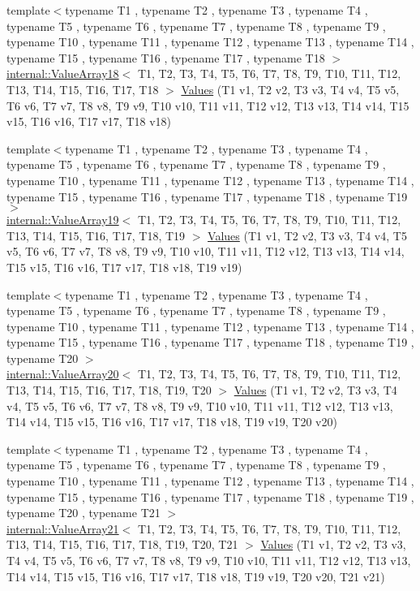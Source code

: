 \begin{DoxyCompactItemize}
\item 
{\footnotesize template$<$typename T1 , typename T2 , typename T3 , typename T4 , typename T5 , typename T6 , typename T7 , typename T8 , typename T9 , typename T10 , typename T11 , typename T12 , typename T13 , typename T14 , typename T15 , typename T16 , typename T17 , typename T18 $>$ }\\\mbox{\hyperlink{classtesting_1_1internal_1_1ValueArray18}{internal\+::\+Value\+Array18}}$<$ T1, T2, T3, T4, T5, T6, T7, T8, T9, T10, T11, T12, T13, T14, T15, T16, T17, T18 $>$ \mbox{\hyperlink{namespacetesting_ab442a00c98b4bfb3bfa81f5e06bf53f9}{Values}} (T1 v1, T2 v2, T3 v3, T4 v4, T5 v5, T6 v6, T7 v7, T8 v8, T9 v9, T10 v10, T11 v11, T12 v12, T13 v13, T14 v14, T15 v15, T16 v16, T17 v17, T18 v18)
\item 
{\footnotesize template$<$typename T1 , typename T2 , typename T3 , typename T4 , typename T5 , typename T6 , typename T7 , typename T8 , typename T9 , typename T10 , typename T11 , typename T12 , typename T13 , typename T14 , typename T15 , typename T16 , typename T17 , typename T18 , typename T19 $>$ }\\\mbox{\hyperlink{classtesting_1_1internal_1_1ValueArray19}{internal\+::\+Value\+Array19}}$<$ T1, T2, T3, T4, T5, T6, T7, T8, T9, T10, T11, T12, T13, T14, T15, T16, T17, T18, T19 $>$ \mbox{\hyperlink{namespacetesting_a673757dbfc048bbb48e459485b30b2bf}{Values}} (T1 v1, T2 v2, T3 v3, T4 v4, T5 v5, T6 v6, T7 v7, T8 v8, T9 v9, T10 v10, T11 v11, T12 v12, T13 v13, T14 v14, T15 v15, T16 v16, T17 v17, T18 v18, T19 v19)
\item 
{\footnotesize template$<$typename T1 , typename T2 , typename T3 , typename T4 , typename T5 , typename T6 , typename T7 , typename T8 , typename T9 , typename T10 , typename T11 , typename T12 , typename T13 , typename T14 , typename T15 , typename T16 , typename T17 , typename T18 , typename T19 , typename T20 $>$ }\\\mbox{\hyperlink{classtesting_1_1internal_1_1ValueArray20}{internal\+::\+Value\+Array20}}$<$ T1, T2, T3, T4, T5, T6, T7, T8, T9, T10, T11, T12, T13, T14, T15, T16, T17, T18, T19, T20 $>$ \mbox{\hyperlink{namespacetesting_aedd2f90dfb3c42dce713ba0b89cde96c}{Values}} (T1 v1, T2 v2, T3 v3, T4 v4, T5 v5, T6 v6, T7 v7, T8 v8, T9 v9, T10 v10, T11 v11, T12 v12, T13 v13, T14 v14, T15 v15, T16 v16, T17 v17, T18 v18, T19 v19, T20 v20)
\item 
{\footnotesize template$<$typename T1 , typename T2 , typename T3 , typename T4 , typename T5 , typename T6 , typename T7 , typename T8 , typename T9 , typename T10 , typename T11 , typename T12 , typename T13 , typename T14 , typename T15 , typename T16 , typename T17 , typename T18 , typename T19 , typename T20 , typename T21 $>$ }\\\mbox{\hyperlink{classtesting_1_1internal_1_1ValueArray21}{internal\+::\+Value\+Array21}}$<$ T1, T2, T3, T4, T5, T6, T7, T8, T9, T10, T11, T12, T13, T14, T15, T16, T17, T18, T19, T20, T21 $>$ \mbox{\hyperlink{namespacetesting_a6f3b9661b48f2c663dbe5fcfb0720f5f}{Values}} (T1 v1, T2 v2, T3 v3, T4 v4, T5 v5, T6 v6, T7 v7, T8 v8, T9 v9, T10 v10, T11 v11, T12 v12, T13 v13, T14 v14, T15 v15, T16 v16, T17 v17, T18 v18, T19 v19, T20 v20, T21 v21)

\end{DoxyCompactItemize}

